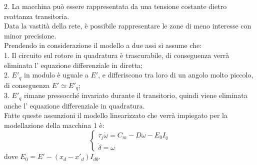 \documentclass[Lau,noexaminfo]{sapthesis}
\begin{document}
	2. La macchina può essere rappresentata da una tensione costante dietro reattanza transitoria.\\
	Data la vastità della rete,  è possibile rappresentare le zone di meno interesse con minor precisione.\\
	Prendendo in considerazione il modello a due assi si assume che:\\
	1. Il circuito sul rotore in quadratura è trascurabile, di conseguenza verrà eliminata l' equazione differenziale in diretta;\\
	2. $E'_q$ in modulo è uguale a $E'$, e differiscono tra loro di un angolo molto piccolo, di conseguenza $E'\simeq E'_q$;\\
	3. $E'_q$ rimane pressocché invariato durante il transitorio, quindi viene eliminata anche l' equazione differenziale in quadratura.\\
	Fatte queste assunzioni il modello linearizzato che verrà impiegato per la modellazione della macchina 1 è:\\
	\[
	\begin{cases}
	\tau_j\dot{\omega}=C_m-D\omega-E_0I_q\\
	\dot{\delta}=\omega
	\end{cases}
	\]
	dove $E_0=E'-(x_d-x'_d)I_{d0}$.
\end{document}
